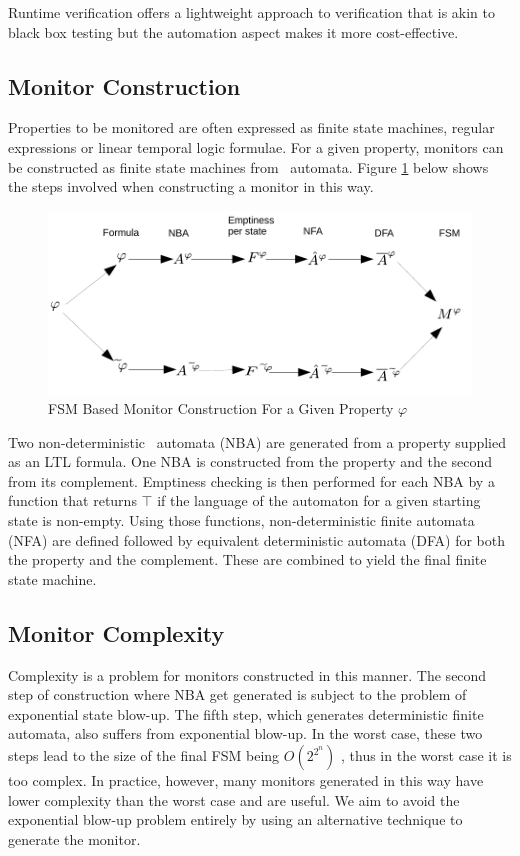 \noindent Runtime verification offers a lightweight approach to verification that is akin to black box testing but the automation aspect makes it more cost-effective.

\subsection{Monitor Construction}

Properties to be monitored are often expressed as finite state machines, regular expressions or linear temporal logic formulae.  For a given property, monitors can be constructed as finite state machines from \Buchi\ automata.  Figure \ref{fig:FSMConstruction} below shows the steps involved when constructing a monitor in this way.

\begin{figure}[h!]
  \centering
  \includegraphics[width=\textwidth]{graphics/BuchiContructionFlow}
  \caption{FSM Based Monitor Construction For a Given Property $\varphi$\cite{RVForLTLAndTLTL}}
  \label{fig:FSMConstruction}
\end{figure}

Two non-deterministic \Buchi\ automata (NBA) are generated from a property supplied as an LTL formula.  One NBA is constructed from the property and the second from its complement.  Emptiness checking is then performed for each NBA by a function that returns $\top$ if the language of the automaton for a given starting state is non-empty.  Using those functions, non-deterministic finite automata (NFA) are defined followed by equivalent deterministic automata (DFA) for both the property and the complement.  These are combined to yield the final finite state machine.

\subsection{Monitor Complexity}

Complexity is a problem for monitors constructed in this manner.  The second step of construction where NBA get generated is subject to the problem of exponential state blow-up.  The fifth step, which generates deterministic finite automata, also suffers from exponential blow-up.  In the worst case, these two steps lead to the size of the final FSM being $O(2^{2^n})$ \cite{RVForLTLAndTLTL}, thus in the worst case it is too complex.  In practice, however, many monitors generated in this way have lower complexity than the worst case and are useful.  We aim to avoid the exponential blow-up problem entirely by using an alternative technique to generate the monitor.

